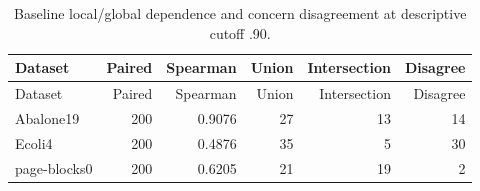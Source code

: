 \begin{longtable}{lrrrrr}
\caption{Baseline local/global dependence and concern disagreement at descriptive cutoff .90.}\label{tab:evidence}\\
\toprule
Dataset & Paired & Spearman & Union & Intersection & Disagree \\
\midrule
\endfirsthead
\toprule
Dataset & Paired & Spearman & Union & Intersection & Disagree \\
\midrule
\endhead
Abalone19 & 200 & 0.9076 & 27 & 13 & 14 \\
Ecoli4 & 200 & 0.4876 & 35 & 5 & 30 \\
page-blocks0 & 200 & 0.6205 & 21 & 19 & 2 \\
\bottomrule
\end{longtable}
